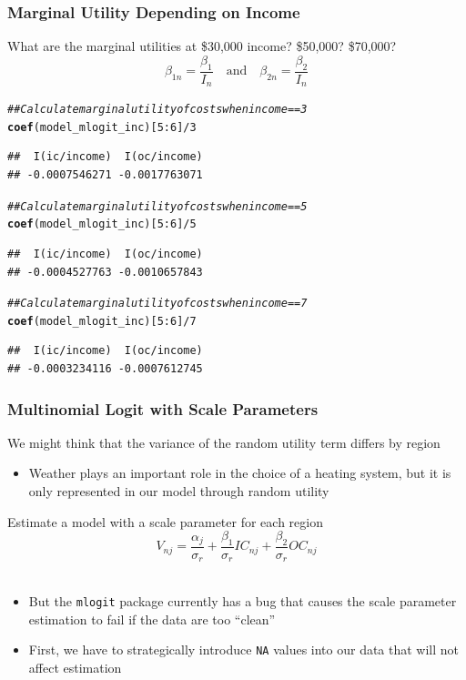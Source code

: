 \documentclass{beamer}\usepackage[]{graphicx}\usepackage[]{xcolor}
\makeatletter
\newcommand{\hlnum}[1]{\textcolor[rgb]{0.686,0.059,0.569}{#1}}%
\newcommand{\hlcom}[1]{\textcolor[rgb]{0.678,0.584,0.686}{\textit{#1}}}%
\newcommand{\hlopt}[1]{\textcolor[rgb]{0,0,0}{#1}}%
\newcommand{\hlstd}[1]{\textcolor[rgb]{0.345,0.345,0.345}{#1}}%
\newcommand{\hlkwd}[1]{\textcolor[rgb]{0.737,0.353,0.396}{\textbf{#1}}}%
\newenvironment{kframe}{%
 \def\at@end@of@kframe{}%
 \ifinner\ifhmode%
  \def\at@end@of@kframe{\end{minipage}}%
  \begin{minipage}{\columnwidth}%
 \fi\fi%
 \def\FrameCommand##1{\hskip\@totalleftmargin \hskip-\fboxsep
 \colorbox{shadecolor}{##1}\hskip-\fboxsep
     \hskip-\linewidth \hskip-\@totalleftmargin \hskip\columnwidth}%
 \MakeFramed {\advance\hsize-\width
   \@totalleftmargin\z@ \linewidth\hsize
   \@setminipage}}%
 {\par\unskip\endMakeFramed%
 \at@end@of@kframe}
\newenvironment{knitrout}{}{} %
\makeatother
\begin{document}
\begin{frame}[fragile]\frametitle{Marginal Utility Depending on Income}
    What are the marginal utilities at \$30,000 income? \$50,000? \$70,000?
    $$\beta_{1n} = \frac{\beta_1}{I_n} \quad \text{and} \quad \beta_{2n} = \frac{\beta_2}{I_n}$$
\begin{knitrout}\footnotesize
{}\color{fgcolor}\begin{kframe}
\begin{alltt}
\hlcom{## Calculate marginal utility of costs when income == 3}
\hlkwd{coef}\hlstd{(model_mlogit_inc)[}\hlnum{5}\hlopt{:}\hlnum{6}\hlstd{]} \hlopt{/} \hlnum{3}
\end{alltt}
\begin{verbatim}
##  I(ic/income)  I(oc/income) 
## -0.0007546271 -0.0017763071
\end{verbatim}
\begin{alltt}
\hlcom{## Calculate marginal utility of costs when income == 5}
\hlkwd{coef}\hlstd{(model_mlogit_inc)[}\hlnum{5}\hlopt{:}\hlnum{6}\hlstd{]} \hlopt{/} \hlnum{5}
\end{alltt}
\begin{verbatim}
##  I(ic/income)  I(oc/income) 
## -0.0004527763 -0.0010657843
\end{verbatim}
\begin{alltt}
\hlcom{## Calculate marginal utility of costs when income == 7}
\hlkwd{coef}\hlstd{(model_mlogit_inc)[}\hlnum{5}\hlopt{:}\hlnum{6}\hlstd{]} \hlopt{/} \hlnum{7}
\end{alltt}
\begin{verbatim}
##  I(ic/income)  I(oc/income) 
## -0.0003234116 -0.0007612745
\end{verbatim}
\end{kframe}
\end{knitrout}
\end{frame}

\begin{frame}\frametitle{Multinomial Logit with Scale Parameters}
    We might think that the variance of the random utility term differs by region
    \begin{itemize}
    	\item Weather plays an important role in the choice of a heating system, but it is only represented in our model through random utility
    \end{itemize}
    \vspace{2ex}
    Estimate a model with a scale parameter for each region
    $$V_{nj} = \frac{\alpha_j}{\sigma_r} + \frac{\beta_1}{\sigma_r} IC_{nj} + \frac{\beta_2}{\sigma_r} OC_{nj}$$ \\
    \vspace{-1ex}
    \begin{itemize}
    	\item But the \texttt{mlogit} package currently has a bug that causes the scale parameter estimation to fail if the data are too ``clean''
    	\item First, we have to strategically introduce \texttt{NA} values into our data that will not affect estimation
    \end{itemize}
\end{frame}
\end{document}
